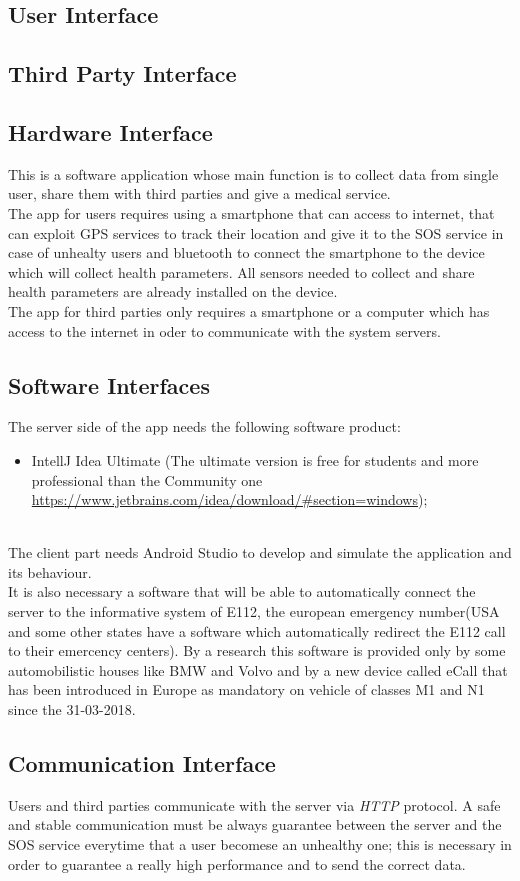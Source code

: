 \subsection{User Interface}


\subsection{Third Party Interface}


\subsection{Hardware Interface}
This is a software application whose main function is to collect data from single user, share them with third parties and give a medical service.\\
The app for users requires using a smartphone that can access to internet, that can exploit GPS services to track their location and give it to the SOS service in case of unhealty users and bluetooth to connect the smartphone to the device which will collect health parameters.
All sensors needed to collect and share health parameters are already installed on the device.\\
The app for third parties only requires a smartphone or a computer which has access to the internet in oder to communicate with the system servers.


\subsection{Software Interfaces}
The server side of the app needs the following software product:
\begin{itemize}
	\item IntellJ Idea Ultimate (The ultimate version is free for students and more professional than the Community one \url{https://www.jetbrains.com/idea/download/#section=windows});
\end{itemize}\\
The client part needs Android Studio to develop and simulate the application and its behaviour.\\
It is also necessary a software that will be able to automatically connect the server to the informative system of E112, the european emergency number(USA and some other states have a software which automatically redirect the E112 call to their emercency centers). By a research this software is provided only by some automobilistic houses like BMW and Volvo and by a new device called eCall that has been introduced in Europe as mandatory on vehicle of classes M1 and N1 since the 31-03-2018.


\subsection{Communication Interface}
Users and third parties communicate with the server via \textit{HTTP} protocol.
A safe and stable communication must be always guarantee between the server and the SOS service everytime that a user becomese an unhealthy one; this is necessary in order to guarantee a really high performance and to send the correct data.
